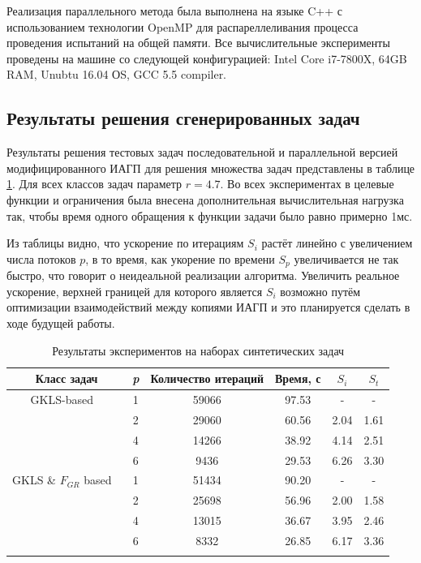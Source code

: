 \documentclass[11pt, oneside, a4paper]{article}
\begin{document}
Реализация параллельного метода была выполнена на языке C++ с использованием технологии OpenMP
для распареллеливания процесса проведения испытаний на общей памяти. Все вычислительные
эксперименты проведены на машине со следующей конфигурацией: Intel Core i7-7800X, 64GB RAM, Unubtu 16.04 ОS, GCC 5.5 compiler.

\subsection{Результаты решения сгенерированных задач}

Результаты решения тестовых задач последовательной и параллельной версией модифицированного ИАГП
для решения множества задач представлены в таблице \ref{tab:speedup}. Для всех классов задач параметр \(r=4.7\).
Во всех экспериментах в целевые функции и ограничения была внесена дополнительная вычислительная нагрузка так,
чтобы время одного обращения к функции задачи было равно примерно 1мс.

Из таблицы видно, что ускорение по итерациям \(S_i\) растёт линейно с увеличением числа потоков \(p\),
в то время, как укорение по времени \(S_p\) увеличивается не так быстро, что говорит о неидеальной
реализации алгоритма. Увеличить реальное ускорение, верхней границей для которого является
\(S_i\) возможно путём оптимизации взаимодействий между копиями ИАГП и это планируется сделать в ходе будущей работы.

\begin{table}
  \centering
  \caption{Результаты экспериментов на наборах синтетических задач}
  \label{tab:speedup}
  \begin{tabular}{c|c|cccc}
    Класс задач & \textit{p} & Количество итераций & Время, с & \(S_i\) & \(S_t\)   \\
    \hline
    GKLS-based \
         & 1 & 59066 & 97.53 & -    & - \\
         & 2 & 29060 & 60.56 & 2.04 & 1.61 \\
         & 4 & 14266 & 38.92 & 4.14 & 2.51 \\
         & 6 & 9436  & 29.53 & 6.26 & 3.30 \\
    \hline
    GKLS \& \(F_{GR}\) based \
         & 1 & 51434 & 90.20 & -    & - \\
         & 2 & 25698 & 56.96 & 2.00 & 1.58 \\
         & 4 & 13015 & 36.67 & 3.95 & 2.46 \\
         & 6 & 8332  & 26.85 & 6.17 & 3.36 \\
        \noalign{\smallskip}\hline
  \end{tabular}
\end{table}
\end{document}
